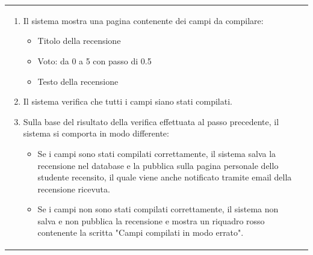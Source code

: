 \documentclass[10pt,a4paper]{report}
\begin{document}
\begin{tabular}{lp{}}
\begin{enumerate}
			\item Il sistema mostra una pagina contenente dei campi da compilare:
			\begin{itemize}
				\item Titolo della recensione
				\item Voto: da 0 a 5 con passo di 0.5
				\item Testo della recensione
			\end{itemize}
			\item Il sistema verifica che tutti i campi siano stati compilati.
			\item Sulla base del risultato della verifica effettuata al passo precedente, il sistema si comporta in modo differente:
			\begin{itemize}
				\item Se i campi sono stati compilati correttamente, il sistema salva la recensione nel database e la pubblica sulla pagina personale dello studente recensito, il quale viene anche notificato tramite email della recensione ricevuta.
				\item Se i campi non sono stati compilati correttamente, il sistema non salva e non pubblica la recensione e mostra un riquadro rosso contenente la scritta "Campi compilati in modo errato".
			\end{itemize}
		\end{enumerate}
	\end{tabular}
\end{document}
